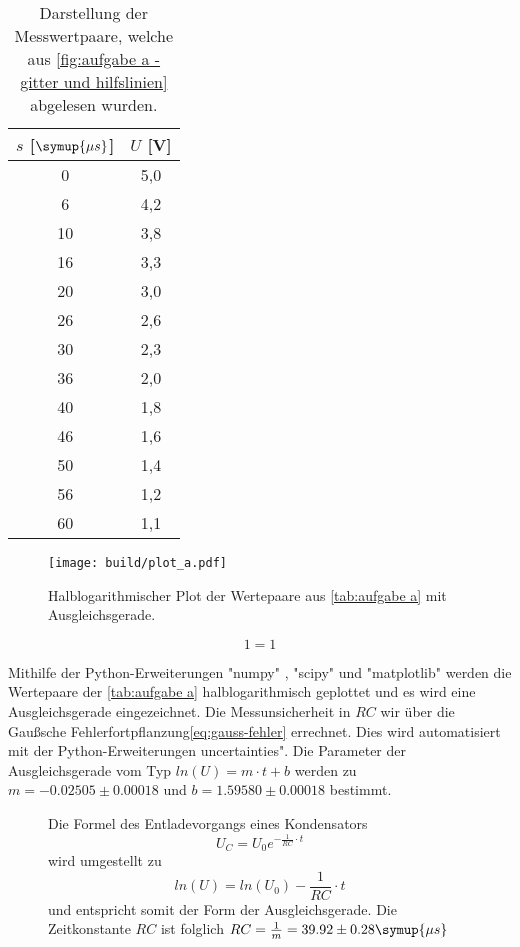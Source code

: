 \begin{table}
  \centering
  \caption{Darstellung der Messwertpaare, welche aus \autoref{fig:aufgabe a - gitter und hilfslinien} abgelesen wurden.}
  \label{tab:aufgabe a}
  \begin{tabular}{S[table-format=2.0] S[table-format=1.1]}
    \toprule
    {$s$ [$\symup{\mu s}$]} & {$U$ [V]} \\
     &  5,0 \\
    6	&  4,2 \\
    10 & 3,8 \\
    16 & 3,3 \\
    20 & 3,0 \\
    26 & 2,6 \\
    30 & 2,3 \\
    36 & 2,0 \\
    40 & 1,8 \\
    46 & 1,6 \\
    50 & 1,4 \\
    56 & 1,2 \\
    60 & 1,1 \\
    \bottomrule
  \end{tabular}
\end{table}

\begin{figure}
  \centering
  \texttt{[image: build/plot\_a.pdf]}
  \caption{Halblogarithmischer Plot der Wertepaare aus \autoref{tab:aufgabe a} %
  mit Ausgleichsgerade.}
  \label{fig:plot_a}
\end{figure}

\begin{equation}
  1=1
  \label{eq:gauss-fehler}
\end{equation}

Mithilfe der Python-Erweiterungen "numpy" \cite{numpy}, "scipy" \cite{scipy} und "matplotlib" \cite{matplotlib} werden die Wertepaare der 
\autoref{tab:aufgabe a} halblogarithmisch geplottet und es wird eine Ausgleichsgerade eingezeichnet. Die Messunsicherheit in $RC$
wir über die Gaußsche Fehlerfortpflanzung\autoref{eq:gauss-fehler} errechnet. Dies wird automatisiert mit der Python-Erweiterungen
\dq uncertainties"\cite{uncertainties}. Die Parameter der
Ausgleichsgerade vom Typ $ln(U) = m \cdot t + b$ werden zu $m=-0.02505\pm0.00018$ und $b=1.59580\pm0.00018$ bestimmt.
\begin{figure}[!h]
  Die Formel des Entladevorgangs eines Kondensators
  \begin{equation}
    U_{C} = U_{0}e^{-\frac{1}{RC}\cdot t}
  \end{equation}
  wird umgestellt zu
  \begin{equation}
    ln(U) = ln(U_{0})-\frac{1}{RC}\cdot t
  \end{equation}
  und entspricht somit der Form der Ausgleichsgerade. Die Zeitkonstante $RC$ ist folglich 
  $RC = \frac{1}{m} = 39.92\pm0.28 \symup{\mu s}$
\end{figure}

